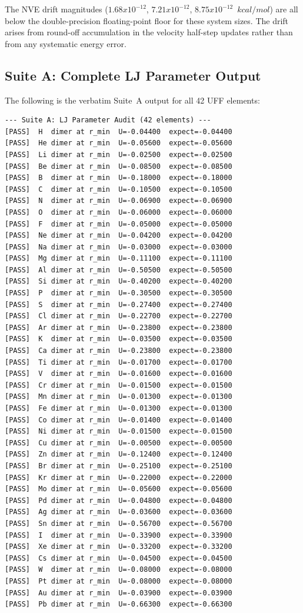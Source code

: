 \documentclass[11pt,twoside]{article}
\def\times{x}%
\def\kcalmol{kcal/mol}%
\newcommand{\kcalmol}{\text{kcal/mol}}
\begin{document}
The NVE drift magnitudes ($1.68 \times 10^{-12}$, $7.21 \times 10^{-12}$, $8.75 \times 10^{-12}$~$\kcalmol$) are all below the double-precision floating-point floor for these system sizes. The drift arises from round-off accumulation in the velocity half-step updates rather than from any systematic energy error.

\subsection{Suite A: Complete LJ Parameter Output}

The following is the verbatim Suite~A output for all 42 UFF elements:

\begin{lstlisting}[language={}, basicstyle=\ttfamily\scriptsize, frame=single,
  caption={Suite A: LJ parameter audit (verbatim, 42/42 PASS)}]
--- Suite A: LJ Parameter Audit (42 elements) ---
[PASS]  H  dimer at r_min  U=-0.04400  expect=-0.04400
[PASS]  He dimer at r_min  U=-0.05600  expect=-0.05600
[PASS]  Li dimer at r_min  U=-0.02500  expect=-0.02500
[PASS]  Be dimer at r_min  U=-0.08500  expect=-0.08500
[PASS]  B  dimer at r_min  U=-0.18000  expect=-0.18000
[PASS]  C  dimer at r_min  U=-0.10500  expect=-0.10500
[PASS]  N  dimer at r_min  U=-0.06900  expect=-0.06900
[PASS]  O  dimer at r_min  U=-0.06000  expect=-0.06000
[PASS]  F  dimer at r_min  U=-0.05000  expect=-0.05000
[PASS]  Ne dimer at r_min  U=-0.04200  expect=-0.04200
[PASS]  Na dimer at r_min  U=-0.03000  expect=-0.03000
[PASS]  Mg dimer at r_min  U=-0.11100  expect=-0.11100
[PASS]  Al dimer at r_min  U=-0.50500  expect=-0.50500
[PASS]  Si dimer at r_min  U=-0.40200  expect=-0.40200
[PASS]  P  dimer at r_min  U=-0.30500  expect=-0.30500
[PASS]  S  dimer at r_min  U=-0.27400  expect=-0.27400
[PASS]  Cl dimer at r_min  U=-0.22700  expect=-0.22700
[PASS]  Ar dimer at r_min  U=-0.23800  expect=-0.23800
[PASS]  K  dimer at r_min  U=-0.03500  expect=-0.03500
[PASS]  Ca dimer at r_min  U=-0.23800  expect=-0.23800
[PASS]  Ti dimer at r_min  U=-0.01700  expect=-0.01700
[PASS]  V  dimer at r_min  U=-0.01600  expect=-0.01600
[PASS]  Cr dimer at r_min  U=-0.01500  expect=-0.01500
[PASS]  Mn dimer at r_min  U=-0.01300  expect=-0.01300
[PASS]  Fe dimer at r_min  U=-0.01300  expect=-0.01300
[PASS]  Co dimer at r_min  U=-0.01400  expect=-0.01400
[PASS]  Ni dimer at r_min  U=-0.01500  expect=-0.01500
[PASS]  Cu dimer at r_min  U=-0.00500  expect=-0.00500
[PASS]  Zn dimer at r_min  U=-0.12400  expect=-0.12400
[PASS]  Br dimer at r_min  U=-0.25100  expect=-0.25100
[PASS]  Kr dimer at r_min  U=-0.22000  expect=-0.22000
[PASS]  Mo dimer at r_min  U=-0.05600  expect=-0.05600
[PASS]  Pd dimer at r_min  U=-0.04800  expect=-0.04800
[PASS]  Ag dimer at r_min  U=-0.03600  expect=-0.03600
[PASS]  Sn dimer at r_min  U=-0.56700  expect=-0.56700
[PASS]  I  dimer at r_min  U=-0.33900  expect=-0.33900
[PASS]  Xe dimer at r_min  U=-0.33200  expect=-0.33200
[PASS]  Cs dimer at r_min  U=-0.04500  expect=-0.04500
[PASS]  W  dimer at r_min  U=-0.08000  expect=-0.08000
[PASS]  Pt dimer at r_min  U=-0.08000  expect=-0.08000
[PASS]  Au dimer at r_min  U=-0.03900  expect=-0.03900
[PASS]  Pb dimer at r_min  U=-0.66300  expect=-0.66300
\end{lstlisting}
\end{document}
